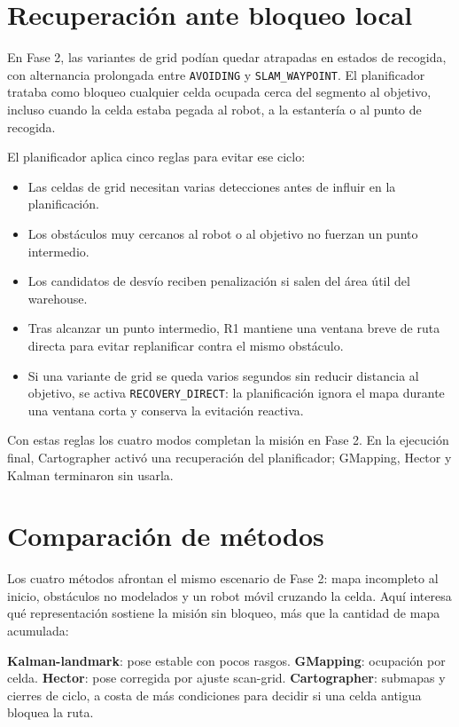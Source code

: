 \section{Recuperación ante bloqueo local}

En Fase 2, las variantes de grid podían quedar atrapadas en estados de
recogida, con alternancia prolongada entre \texttt{AVOIDING} y
\texttt{SLAM\_WAYPOINT}. El planificador trataba como bloqueo cualquier celda ocupada
cerca del segmento al objetivo, incluso cuando la celda estaba pegada al robot,
a la estantería o al punto de recogida.

El planificador aplica cinco reglas para evitar ese ciclo:

\begin{itemize}
  \item Las celdas de grid necesitan varias detecciones antes de influir en
  la planificación.
  \item Los obstáculos muy cercanos al robot o al objetivo no fuerzan un punto intermedio.
  \item Los candidatos de desvío reciben penalización si salen del área útil del
  warehouse.
  \item Tras alcanzar un punto intermedio, R1 mantiene una ventana breve de ruta directa
  para evitar replanificar contra el mismo obstáculo.
  \item Si una variante de grid se queda varios segundos sin reducir distancia
  al objetivo, se activa \texttt{RECOVERY\_DIRECT}: la planificación ignora el
  mapa durante una ventana corta y conserva la evitación reactiva.
\end{itemize}

Con estas reglas los cuatro modos completan la misión en Fase 2. En la ejecución
final, Cartographer activó una recuperación del planificador; GMapping, Hector y
Kalman terminaron sin usarla.

\section{Comparación de métodos}

Los cuatro métodos afrontan el mismo escenario de Fase 2: mapa incompleto al
inicio, obstáculos no modelados y un robot móvil cruzando la celda. Aquí interesa
qué representación sostiene la misión sin bloqueo, más que la cantidad de mapa
acumulada:

\begin{summarybox}
\textbf{Kalman-landmark}: pose estable con pocos rasgos.
\textbf{GMapping}: ocupación por celda.
\textbf{Hector}: pose corregida por ajuste scan-grid.
\textbf{Cartographer}: submapas y cierres de ciclo, a costa de más condiciones para decidir si una celda antigua bloquea la ruta.
\end{summarybox}


